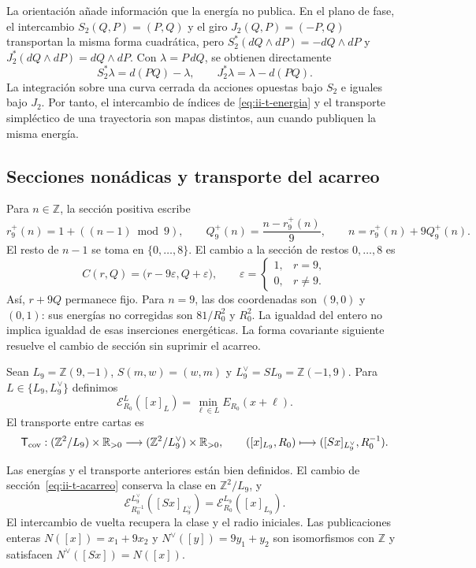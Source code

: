 La orientación añade información que la energía no publica. En el plano
de fase, el intercambio \(S_2(Q,P)=(P,Q)\) y el giro
\(J_2(Q,P)=(-P,Q)\) transportan la misma forma cuadrática, pero
\(S_2^*(dQ\wedge dP)=-dQ\wedge dP\) y
\(J_2^*(dQ\wedge dP)=dQ\wedge dP\). Con
\(\lambda=P\,dQ\), se obtienen directamente
\[
 S_2^*\lambda=d(PQ)-\lambda,\qquad
 J_2^*\lambda=\lambda-d(PQ).
\]
La integración sobre una curva cerrada da acciones opuestas bajo \(S_2\)
e iguales bajo \(J_2\). Por tanto, el intercambio de índices de
\eqref{eq:ii-t-energia} y el transporte simpléctico de una trayectoria
son mapas distintos, aun cuando publiquen la misma energía.

\subsection{Secciones nonádicas y transporte del acarreo}

Para \(n\in\mathbb Z\), la sección positiva escribe
\[
 r_9^+(n)=1+((n-1)\bmod9),\qquad
 Q_9^+(n)=\frac{n-r_9^+(n)}9,\qquad n=r_9^+(n)+9Q_9^+(n).
\]
El resto de \(n-1\) se toma en \(\{0,\ldots,8\}\). El cambio a
la sección de restos \(0,\ldots,8\) es
\begin{equation}
 C(r,Q)=\bigl(r-9\varepsilon,Q+\varepsilon\bigr),\qquad
 \varepsilon=\begin{cases}1,&r=9,\\0,&r\ne9.\end{cases}
 \label{eq:ii-t-acarreo}
\end{equation}
Así, \(r+9Q\) permanece fijo. Para \(n=9\), las dos coordenadas
son \((9,0)\) y \((0,1)\): sus energías no corregidas son
\(81/R_0^2\) y \(R_0^2\). La igualdad del entero no implica
igualdad de esas inserciones energéticas. La forma covariante siguiente
resuelve el cambio de sección sin suprimir el acarreo.

\begin{definition}
\label{def:ii-t-cociente}
Sean \(L_9=\mathbb Z(9,-1)\), \(S(m,w)=(w,m)\) y
\(L_9^\vee=SL_9=\mathbb Z(-1,9)\). Para
\(L\in\{L_9,L_9^\vee\}\) definimos
\[
 \mathcal E_{R_0}^{L}([x]_L)
 =\min_{\ell\in L}E_{R_0}(x+\ell).
\]
El transporte entre cartas es
\[
 \mathsf T_{\rm cov}:
 (\mathbb Z^2/L_9)\times\mathbb R_{>0}
 \longrightarrow
 (\mathbb Z^2/L_9^\vee)\times\mathbb R_{>0},\qquad
 ([x]_{L_9},R_0)\longmapsto([Sx]_{L_9^\vee},R_0^{-1}).
\]
\end{definition}

\begin{theorem}
\label{thm:ii-t-cociente}
Las energías y el transporte anteriores están bien definidos. El cambio
de sección~\eqref{eq:ii-t-acarreo} conserva la clase en
\(\mathbb Z^2/L_9\), y
\begin{equation}
 \mathcal E_{R_0^{-1}}^{L_9^\vee}([Sx]_{L_9^\vee})
 =\mathcal E_{R_0}^{L_9}([x]_{L_9}).
 \label{eq:ii-t-covariancia}
\end{equation}
El intercambio de vuelta recupera la clase y el radio iniciales. Las
publicaciones enteras \(N([x])=x_1+9x_2\) y
\(N^\vee([y])=9y_1+y_2\) son isomorfismos con \(\mathbb Z\)
y satisfacen \(N^\vee([Sx])=N([x])\).
\end{theorem}

